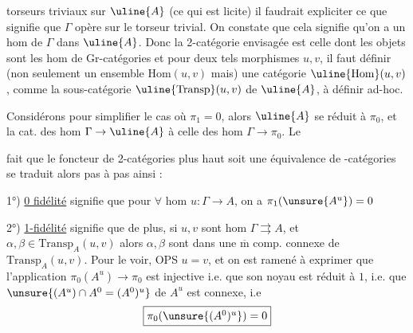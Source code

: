 
torseurs triviaux sur \(\uline{A}\) (ce qui est licite) il faudrait expliciter ce que signifie que \(\Gamma\) opère sur le torseur trivial. On constate que cela signifie qu'on a un hom  de  \(\Gamma\) dans \(\uline{A}\). Donc la 2-catégorie envisagée est celle dont les objets sont les hom de Gr-catégories
et pour deux tels morphismes \(u,v\), il faut définir (non seulement un ensemble \(\mathrm{Hom}(u,v)\) mais) une catégorie \(\uline{\mathrm{Hom}}(u,v)\), comme la sous-catégorie \(\uline{\mathrm{Transp}}(u,v)\) de \(\uline{A}\), à définir ad-hoc.

Considérons pour simplifier le cas où \(\pi_1=0\), alors \(\uline{A}\) se réduit à \(\pi_0\), et la cat. des hom \(\Gamma\to\uline{A}\) à celle des hom \(\Gamma\to\pi_0\). Le


fait que le foncteur de 2-catégories plus haut  soit une équivalence de -catégories se traduit alors pas à pas ainsi :

1°) \uline{0 fidélité} signifie que pour \(\forall\) hom \(u:\Gamma\to A\), on a \(\pi_1(\unsure{A^u})=0\)


2°) \uline{1-fidélité} signifie que de plus, si \(u,v\) sont  hom \(\Gamma\rightrightarrows A\), et  \(\alpha,\beta\in\mathrm{Transp}_A(u,v)\)     alors \(\alpha,\beta\) sont dans une \(\overline{\mathrm m}\)  comp. connexe de \(\mathrm{Transp}_A(u,v)\).    Pour le voir, OPS \(u=v\), et  on est ramené à exprimer que l'application \(\pi_0(A^u)\to\pi_0\) est injective i.e. que  son noyau est réduit à \(1\), i.e. que  \(\unsure{(A^u)\cap A^0=(A^0)^u}\) de \(A^u\) est connexe, i.e
\[
\fbox{\(\pi_0(\unsure{(A^0)^u})=0\)}
\]

